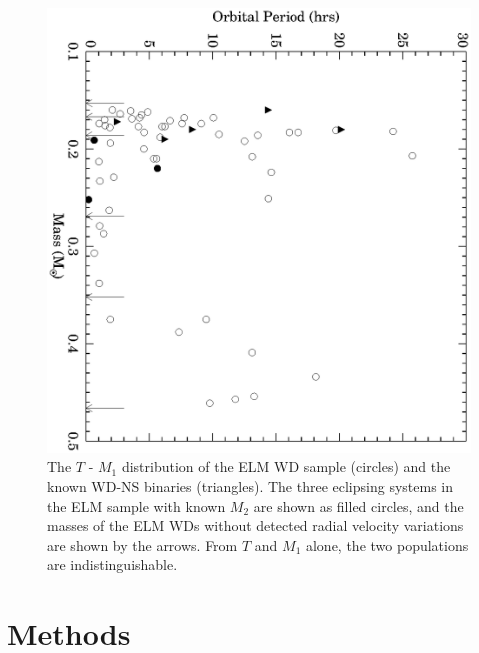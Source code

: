 \documentclass[apjl]{emulateapj}
\newcommand{\period}{T}
\begin{document}
\begin{figure}[h!]
\begin{center}
\includegraphics[angle=90,width=0.95\columnwidth]{Porb_M1.eps}
\caption{The $\period$ - $M_1$ distribution of the ELM WD sample (circles) and the known WD-NS binaries (triangles). The three eclipsing systems in the ELM sample with known $M_2$ are shown as filled circles, and the masses of the ELM WDs without detected radial velocity variations are shown by the arrows. From $\period$ and $M_1$ alone, the two populations are indistinguishable.}
\label{fig:Porb-M1}
\end{center}
\end{figure}




\section{Methods}
\end{document}
